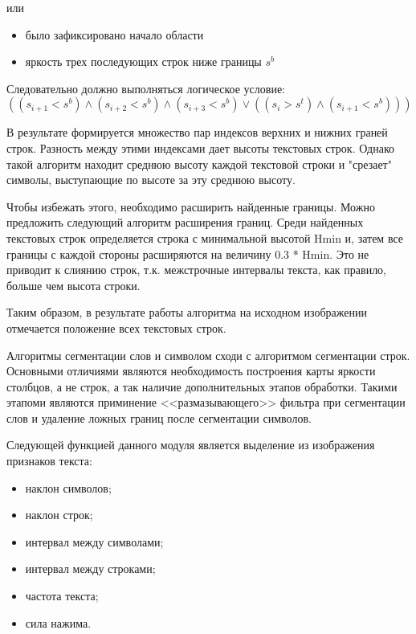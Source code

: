 или

\begin{itemize}
   \item было зафиксировано начало области
   \item яркость трех последующих строк ниже границы $ s^{b} $
\end{itemize}

Следовательно должно выполняться логическое условие:
\begin{displaymath}((s_{i+1} < s^{b}) \wedge (s_{i+2} < s^{b}) \wedge (s_{i+3} < s^{b}) \vee ((s_i > s^{t}) \wedge (s_{i+1} < s^{b})))\end{displaymath}

В результате формируется множество пар индексов верхних и нижних граней строк. Разность между этими индексами дает высоты текстовых строк. Однако такой алгоритм находит среднюю высоту каждой текстовой строки и "срезает" символы, выступающие по высоте за эту среднюю высоту.

Чтобы избежать этого, необходимо расширить найденные границы. Можно предложить следующий алгоритм расширения границ. Среди найденных текстовых строк определяется строка с минимальной высотой Hmin и, затем все границы с каждой стороны расширяются на величину 0.3 * Hmin. Это не приводит к слиянию строк, т.к. межстрочные интервалы текста, как правило, больше чем высота строки.

Таким образом, в результате работы алгоритма на исходном изображении отмечается положение всех текстовых строк.  

Алгоритмы сегментации слов и символом сходи с алгоритмом сегментации строк. Основными отличиями являются необходимость построения карты яркости столбцов, а не строк, а так наличие дополнительных этапов обработки. Такими этапоми являются приминение <<размазывающего>> фильтра при сегментации слов и удаление ложных границ после сегментации символов. 

Следующей функцией данного модуля является выделение из изображения признаков текста:
\begin{itemize}
  \item наклон символов;
  \item наклон строк;
  \item интервал между символами;
  \item интервал между строками;
  \item частота текста;
  \item сила нажима.
\end{itemize}


